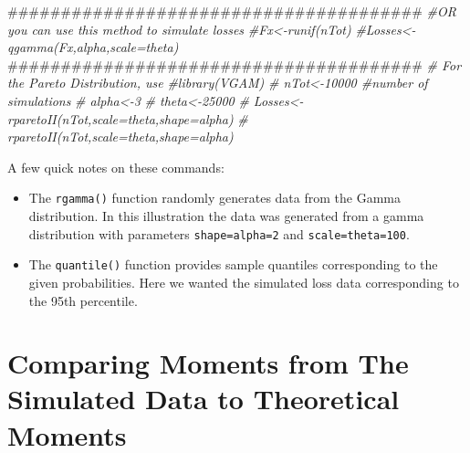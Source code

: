 \documentclass[]{book}
\newenvironment{Shaded}{\begin{snugshade}}{\end{snugshade}}
\newcommand{\CommentTok}[1]{\textcolor[rgb]{0.56,0.35,0.01}{\textit{#1}}}
\newcommand{\NormalTok}[1]{#1}
\providecommand{\tightlist}{%
  \setlength{\itemsep}{0pt}\setlength{\parskip}{0pt}}
\theoremstyle{definition}
\theoremstyle{definition}
\theoremstyle{definition}
\theoremstyle{remark}
\begin{document}
\begin{Shaded}
\begin{Highlighting}[]
\NormalTok{#######################################}
\CommentTok{#OR you can use this method to simulate losses }
\CommentTok{#Fx<-runif(nTot)}
\CommentTok{#Losses<-qgamma(Fx,alpha,scale=theta)}
\NormalTok{#######################################}
\CommentTok{# For the Pareto Distribution, use}
\CommentTok{#library(VGAM)}
\CommentTok{# nTot<-10000  #number of simulations}
\CommentTok{# alpha<-3}
\CommentTok{# theta<-25000}
\CommentTok{# Losses<-rparetoII(nTot,scale=theta,shape=alpha)}
\CommentTok{# rparetoII(nTot,scale=theta,shape=alpha) }
\end{Highlighting}
\end{Shaded}

A few quick notes on these commands:

\begin{itemize}
\tightlist
\item
  The \texttt{rgamma()} function randomly generates data from the Gamma
  distribution. In this illustration the data was generated from a gamma
  distribution with parameters \texttt{shape=alpha=2} and
  \texttt{scale=theta=100}.
\item
  The \texttt{quantile()} function provides sample quantiles
  corresponding to the given probabilities. Here we wanted the simulated
  loss data corresponding to the 95th percentile.
\end{itemize}

\section{Comparing Moments from The Simulated Data to Theoretical
Moments}\label{comparing-moments-from-the-simulated-data-to-theoretical-moments}
\end{document}
